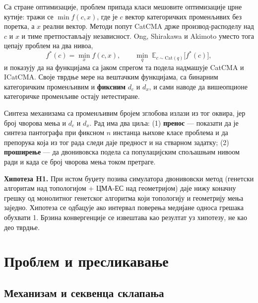 \documentclass[
  conference,
  a4paper,
  10pt]{IEEEtran}
\begin{document}
Са стране оптимизације, проблем припада класи мешовите оптимизације црне
кутије: тражи се \(\min f(c,x)\), где је \(c\) вектор категоричких
променљивих без поретка, а \(x\) реални вектор. Методи попут CatCMA
\citep{catcma} држе производ-расподелу над \(c\) и \(x\) и тиме
претпостављају независност. Ong, Shirakawa и Akimoto \citep{igbd} уместо
тога цепају проблем на два нивоа, \[
f^*(c) = \min_x f(c,x), \qquad \min_{q}\; \mathbb{E}_{c \sim \mathrm{Cat}(q)}\big[f^*(c)\big],
\] и показују да на функцијама са јаком спрегом та подела надмашује
CatCMA и ICatCMA. Своје тврдње мере на вештачким функцијама, са бинарним
категоричким променљивим и \textbf{фиксним} \(d_c\) и \(d_x\), и сами
наводе да вишеопционе категоричке променљиве остају нетестиране.

Синтеза механизама са променљивим бројем зглобова излази из тог оквира,
јер број чворова мења и \(d_c\) и \(d_x\). Рад има два циља: (1)
\textbf{пренос} --- показати да је синтеза пантографа при фиксном \(n\)
инстанца њихове класе проблема и да препорука која из тог рада следи
даје предност и на стварном задатку; (2) \textbf{проширење} --- да
двонивовска подела са популацијским спољашњим нивоом ради и када се број
чворова мења током претраге.

\textbf{Хипотеза H1.} При истом буџету позива симулатора двонивовски
метод (генетски алгоритам над топологијом + ЦМА-ЕС над геометријом) даје
нижу коначну грешку од монолитног генетског алгоритма који топологију и
геометрију мења заједно. Хипотеза се одбацује ако интервал поверења
медијане односа грешака обухвати 1. Брзина конвергенције се извештава
као резултат уз хипотезу, не као део тврдње.

\hypertarget{ux43fux440ux43eux431ux43bux435ux43c-ux438-ux43fux440ux435ux441ux43bux438ux43aux430ux432ux430ux45aux435}{%
\section{Проблем и
пресликавање}\label{ux43fux440ux43eux431ux43bux435ux43c-ux438-ux43fux440ux435ux441ux43bux438ux43aux430ux432ux430ux45aux435}}

\hypertarget{ux43cux435ux445ux430ux43dux438ux437ux430ux43c-ux438-ux441ux435ux43aux432ux435ux43dux446ux430-ux441ux43aux43bux430ux43fux430ux45aux430}{%
\subsection{Механизам и секвенца
склапања}\label{ux43cux435ux445ux430ux43dux438ux437ux430ux43c-ux438-ux441ux435ux43aux432ux435ux43dux446ux430-ux441ux43aux43bux430ux43fux430ux45aux430}}
\end{document}
